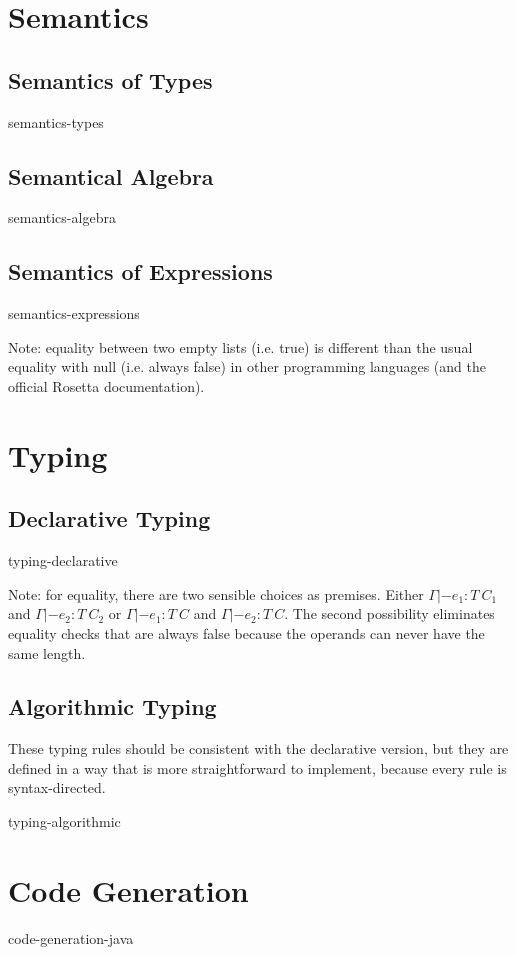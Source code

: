 \documentclass[english,11pt,a4paper]{article}
\begin{document}
\section{Semantics}

\subsection{Semantics of Types}
{semantics-types}

\subsection{Semantical Algebra}
{semantics-algebra}

\subsection{Semantics of Expressions}
{semantics-expressions}

Note: equality between two empty lists (i.e. true) is different than the usual equality with null (i.e. always false) in other programming languages (and the official Rosetta documentation).


\section{Typing}

\subsection{Declarative Typing}

{typing-declarative}

Note: for equality, there are two sensible choices as premises. Either $\Gamma |- e_1 : T\ C_1$ and $\Gamma |- e_2 : T\ C_2$ or $\Gamma |- e_1 : T\ C$ and $\Gamma |- e_2 : T\ C$. The second possibility eliminates equality checks that are always false because the operands can never have the same length.

\subsection{Algorithmic Typing}

These typing rules should be consistent with the declarative version, but they are defined in a way that is more straightforward to implement, because every rule is syntax-directed.

{typing-algorithmic}

\section{Code Generation}

{code-generation-java}
\end{document}

